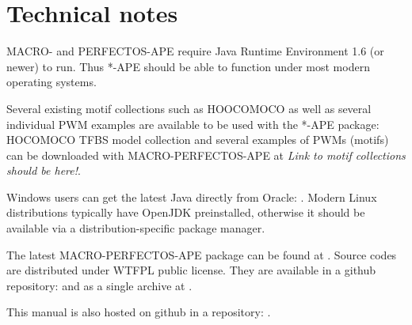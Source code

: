 \section{Technical notes}
MACRO- and PERFECTOS-APE require Java Runtime Environment 1.6 (or newer) to run.
Thus *-APE should be able to function under most modern operating systems.

Several existing motif collections such as HOOCOMOCO as well as several individual PWM examples are available to be used with the *-APE package:
HOCOMOCO  TFBS model collection and several examples of PWMs (motifs) can be downloaded with MACRO-PERFECTOS-APE at \emph{Link to motif collections should be here!}.

Windows users can get the latest Java directly from Oracle: .
Modern Linux distributions typically have OpenJDK preinstalled, otherwise it should be available via a distribution-specific package manager.

The latest MACRO-PERFECTOS-APE package can be found at . Source codes are distributed under WTFPL public license. They are available in a github repository:  and as a single archive at .

This manual is also hosted on github in a repository: .
